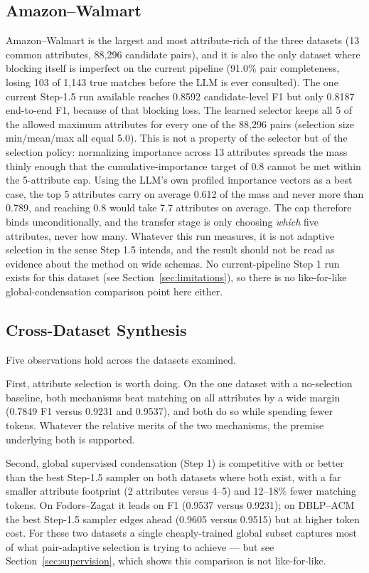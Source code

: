 \documentclass[11pt]{article}
\begin{document}
\subsection{Amazon--Walmart}

Amazon--Walmart is the largest and most attribute-rich of the three datasets (13
common attributes, 88{,}296 candidate pairs), and it is also the only dataset where
blocking itself is imperfect on the current pipeline (91.0\% pair completeness,
losing 103 of 1{,}143 true matches before the LLM is ever consulted). The one current
Step-1.5 run available reaches 0.8592 candidate-level F1 but only 0.8187 end-to-end
F1, because of that blocking loss. The learned selector keeps all 5 of the allowed
maximum attributes for every one of the 88{,}296 pairs (selection size min/mean/max
all equal 5.0). This is not a property of the selector but of the selection policy:
normalizing importance across 13 attributes spreads the mass thinly enough that the
cumulative-importance target of 0.8 cannot be met within the 5-attribute cap. Using
the LLM's own profiled importance vectors as a best case, the top 5 attributes carry
on average 0.612 of the mass and never more than 0.789, and reaching 0.8 would take
7.7 attributes on average. The cap therefore binds unconditionally, and the transfer
stage is only choosing \emph{which} five attributes, never how many. Whatever this
run measures, it is not adaptive selection in the sense Step 1.5 intends, and the
result should not be read as evidence about the method on wide schemas. No
current-pipeline Step 1 run exists for this dataset (see
Section~\ref{sec:limitations}), so there is no like-for-like global-condensation
comparison point here either.

\subsection{Cross-Dataset Synthesis}

Five observations hold across the datasets examined.

First, attribute selection is worth doing. On the one dataset with a no-selection
baseline, both mechanisms beat matching on all attributes by a wide margin
(0.7849 F1 versus 0.9231 and 0.9537), and both do so while spending fewer tokens.
Whatever the relative merits of the two mechanisms, the premise underlying both is
supported.

Second, global supervised condensation (Step 1) is competitive with or better than
the best Step-1.5 sampler on both datasets where both exist, with a far smaller
attribute footprint (2 attributes versus 4--5) and 12--18\% fewer matching tokens.
On Fodors--Zagat it leads on F1 (0.9537 versus 0.9231); on DBLP--ACM the best
Step-1.5 sampler edges ahead (0.9605 versus 0.9515) but at higher token cost. For
these two datasets a single cheaply-trained global subset captures most of what
pair-adaptive selection is trying to achieve --- but see
Section~\ref{sec:supervision}, which shows this comparison is not like-for-like.
\end{document}
